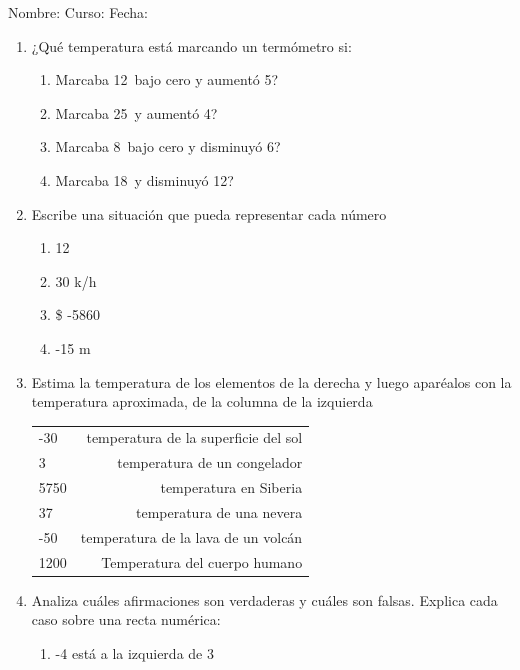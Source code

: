 \documentclass[fleqn]{article}
\newcommand{\LineaNombre}{%
\par
\vspace{\baselineskip}
Nombre:\hrulefill \; Curso: \underline{\hspace*{48pt}} \; Fecha: \underline{\hspace*{2.5cm}} \relax
\par}
\begin{document}
\LineaNombre
\begin{enumerate}
\item ¿Qué temperatura está marcando un termómetro si:
  \begin{enumerate}
  \item Marcaba 12\textcelsius\, bajo cero y aumentó 5\textcelsius? \dotfill
  \item Marcaba 25\textcelsius\, y aumentó 4\textcelsius? \dotfill
  \item Marcaba 8\textcelsius \, bajo cero y disminuyó 6\textcelsius? \dotfill
    \item Marcaba 18\textcelsius\, y disminuyó 12\textcelsius ? \dotfill
    \end{enumerate}
\item Escribe una situación que pueda representar cada número
\begin{enumerate}
  \item 12\textcelsius \, \dotfill
  \item 30 k/h \dotfill
  \item \$ -5860 \dotfill
  \item -15 m \dotfill
  \end{enumerate}
\item Estima la temperatura de los elementos de la derecha y luego aparéalos con la temperatura aproximada, de la columna de la izquierda\\
\begin{center}
\begin{tabular}{p{3cm}r}
		-30\textcelsius  & temperatura de la superficie del sol \\
		3\textcelsius  & temperatura de un congelador \\
		5750\textcelsius & temperatura en Siberia\\
		37\textcelsius & temperatura de una nevera\\
		-50\textcelsius & temperatura de la lava de un volcán\\
		1200\textcelsius  & Temperatura del cuerpo humano \\
	\end{tabular}
\end{center}
\item Analiza cuáles afirmaciones son verdaderas y cuáles son falsas. Explica cada caso sobre una recta numérica:
\begin{enumerate}
  \item -4 está a la izquierda de 3 \noanswer

\end{enumerate}
\end{enumerate}
\end{document}
